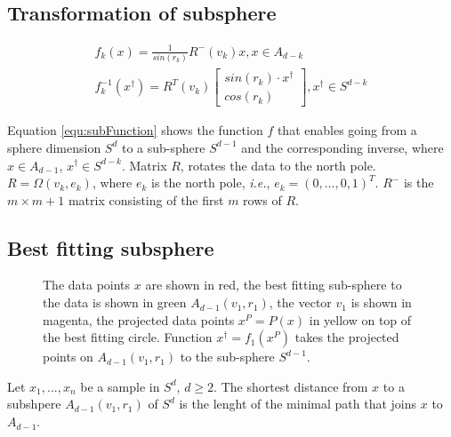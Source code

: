 \subsection{Transformation of subsphere}

\begin{equation}
 \begin{array}{r}
 f_k(x) = \frac{1}{sin(r_k)} R^{-}(v_k)x, x \in A_{d-k} \\
 f_k^{-1}(x^\dagger) = R^T(v_k) \left [ \begin{array}{c}
                                        sin(r_k) \cdot x^\dagger \\
                                        cos(r_k) \end{array} \right ],
                       x^\dagger \in S^{d-k}
 \end{array}
 \label{equ:subFunction}
\end{equation}

Equation \ref{equ:subFunction} shows the function $f$ that enables going from a sphere dimension $S^d$ to a sub-sphere $S^{d-1}$
and the corresponding inverse, where $x \in A_{d-1}$, $x^\dagger \in S^{d-k}$.
Matrix $R$, rotates the data to the north pole.
$R = \Omega(v_k, e_k)$, where $e_k$ is the north pole, \textit{i.e.}, $e_k = (0,...,0,1)^T$.
$R^{-}$ is the $m \times m+1$ matrix consisting of the first $m$ rows of $R$.

\subsection{Best fitting subsphere}

\begin{figure} 
 \centering 
 \caption[Best fitting sphere and projection to sub-sphere]{The data points $x$ are shown in red, the best fitting sub-sphere to the data is shown in green $A_{d-1}(v_1, r_1)$, the vector $v_1$ is shown in magenta,
          the projected data points $x^P = P(x)$ in yellow on top of the best fitting circle. 
          Function $x^\dagger = f_1(x^P)$ takes the projected points on $A_{d-1}(v_1, r_1)$ to the sub-sphere $S^{d-1}$.}
 \label{fig:bestFittingSphere}  
\end{figure}

Let $x_1, ..., x_n$ be a sample in $S^d$, $d \geq 2$. The shortest distance 
from $x$ to a subshpere $A_{d-1}(v_1, r_1)$ of $S^d$ 
is the lenght of the minimal path that joins $x$ to $A_{d-1}$. 


